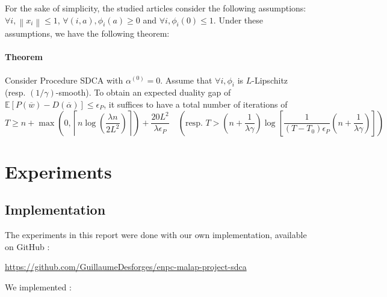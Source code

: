 \documentclass{article}
\newcommand{\norm}[1]{\left\|#1 \right\|}
\begin{document}
For the sake of simplicity, the studied articles consider the following assumptions: $\forall i, \norm{x_i} \leq 1$, $\forall (i,a), \phi_i(a) \geq 0$ and $\forall i, \phi_i(0) \leq 1$.
Under these assumptions, we have the following theorem:

\paragraph{Theorem} Consider Procedure SDCA with $\alpha^{(0)} = 0$.
Assume that $\forall i, \phi_i$ is $L$-Lipschitz (resp. $(1/\gamma)$-smooth).
To obtain an expected duality gap of $\mathbb{E}[P(\overline{w})-D(\overline{\alpha})] \leq \epsilon_P$, it suffices to have a total number of iterations of
$$T \geq n + \max\left(0, \left\lceil n \log \left(\dfrac{\lambda n}{2 L^2} \right) \right\rceil \right) + \dfrac{20 L^2}{\lambda \epsilon_P} \quad \left( \text{resp. } T > \left(n + \dfrac{1}{\lambda \gamma} \right) \log \left[ \dfrac{1}{(T-T_0)\epsilon_P} \left(n + \dfrac{1}{\lambda \gamma} \right) \right] \right)$$ 


\section{Experiments}

\subsection{Implementation}

The experiments in this report were done with our own implementation, available on GitHub :

\url{ https://github.com/GuillaumeDesforges/enpc-malap-project-sdca }

We implemented :
\end{document}
